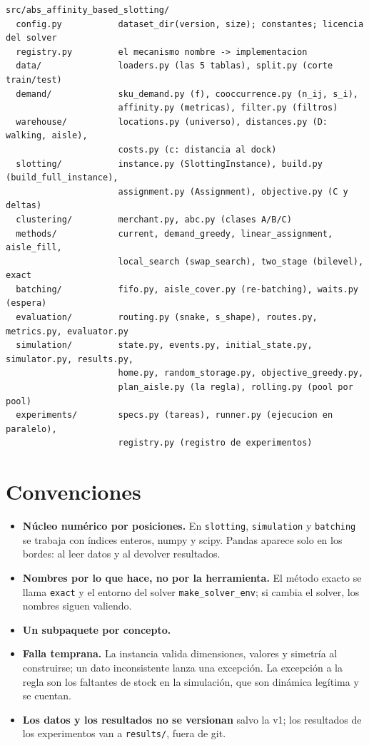 \documentclass[11pt,a4paper,oneside]{report}
\newcommand{\code}[1]{\texttt{\small #1}}
\begin{document}
\begin{lstlisting}[language={}, numbers=none, basicstyle=\ttfamily\scriptsize]
src/abs_affinity_based_slotting/
  config.py           dataset_dir(version, size); constantes; licencia del solver
  registry.py         el mecanismo nombre -> implementacion
  data/               loaders.py (las 5 tablas), split.py (corte train/test)
  demand/             sku_demand.py (f), cooccurrence.py (n_ij, s_i),
                      affinity.py (metricas), filter.py (filtros)
  warehouse/          locations.py (universo), distances.py (D: walking, aisle),
                      costs.py (c: distancia al dock)
  slotting/           instance.py (SlottingInstance), build.py (build_full_instance),
                      assignment.py (Assignment), objective.py (C y deltas)
  clustering/         merchant.py, abc.py (clases A/B/C)
  methods/            current, demand_greedy, linear_assignment, aisle_fill,
                      local_search (swap_search), two_stage (bilevel), exact
  batching/           fifo.py, aisle_cover.py (re-batching), waits.py (espera)
  evaluation/         routing.py (snake, s_shape), routes.py, metrics.py, evaluator.py
  simulation/         state.py, events.py, initial_state.py, simulator.py, results.py,
                      home.py, random_storage.py, objective_greedy.py,
                      plan_aisle.py (la regla), rolling.py (pool por pool)
  experiments/        specs.py (tareas), runner.py (ejecucion en paralelo),
                      registry.py (registro de experimentos)
\end{lstlisting}

\section{Convenciones}

\begin{itemize}
  \item \textbf{Núcleo numérico por posiciones.} En \code{slotting}, \code{simulation} y
        \code{batching} se trabaja con índices enteros, numpy y scipy. Pandas aparece solo en
        los bordes: al leer datos y al devolver resultados.
  \item \textbf{Nombres por lo que hace, no por la herramienta.} El método exacto se llama
        \code{exact} y el entorno del solver \code{make\_solver\_env}; si cambia el solver, los
        nombres siguen valiendo.
  \item \textbf{Un subpaquete por concepto.}
  \item \textbf{Falla temprana.} La instancia valida dimensiones, valores y simetría al
        construirse; un dato inconsistente lanza una excepción. La excepción a la regla son los
        faltantes de stock en la simulación, que son dinámica legítima y se cuentan.
  \item \textbf{Los datos y los resultados no se versionan} salvo la v1; los resultados de los
        experimentos van a \code{results/}, fuera de git.
\end{itemize}
\end{document}
